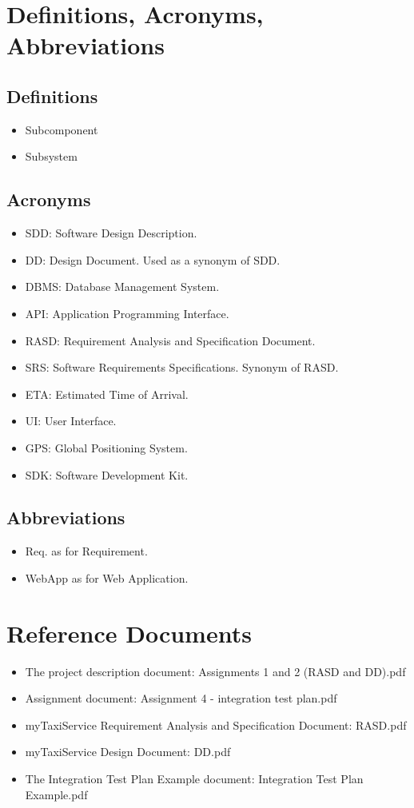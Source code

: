 \section{Definitions, Acronyms, Abbreviations}
\subsection{Definitions}
\begin{itemize}
	\item Subcomponent
	\item Subsystem
\end{itemize}
\subsection{Acronyms}
\begin{itemize}
	\item SDD: Software Design Description.
	\item DD: Design Document. Used as a synonym of SDD.
	\item DBMS: Database Management System.
	\item API: Application Programming Interface.
	\item RASD: Requirement Analysis and Specification Document.
	\item SRS: Software Requirements Specifications. Synonym of RASD.
	\item ETA: Estimated Time of Arrival.
	\item UI: User Interface.
	\item GPS: Global Positioning System.
	\item SDK: Software Development Kit.
\end{itemize}
\subsection{Abbreviations}
\begin{itemize}
	\item Req. as for Requirement.
	\item WebApp as for Web Application.
\end{itemize}
\section{Reference Documents}
\begin{itemize}
	\item The project description document: Assignments 1 and 2 (RASD and DD).pdf
	\item Assignment document: Assignment 4 - integration test plan.pdf
	\item myTaxiService Requirement Analysis and Specification Document: RASD.pdf
	\item myTaxiService Design Document: DD.pdf
	\item The Integration Test Plan Example document: Integration Test Plan Example.pdf
\end{itemize} 